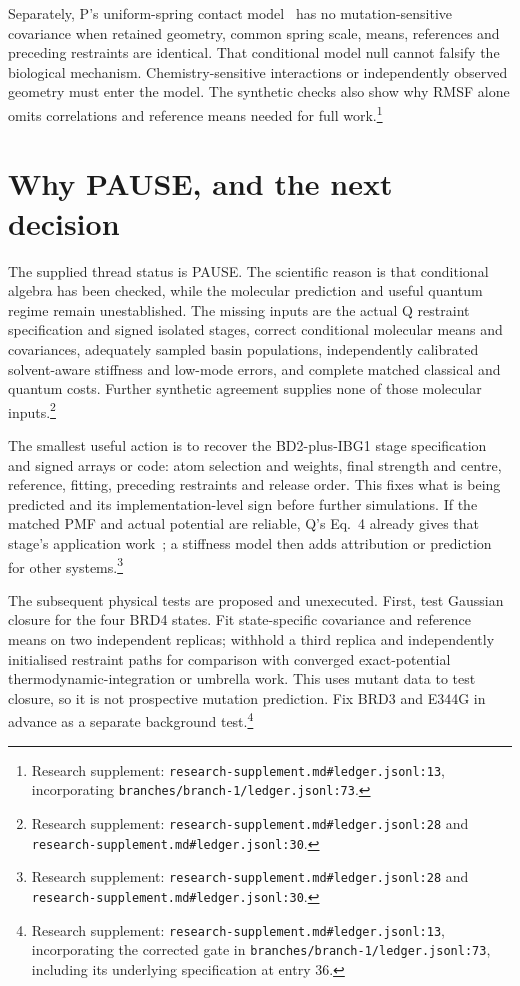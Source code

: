 \documentclass{article}
\begin{document}
Separately, P's uniform-spring contact model~\cite{P} has no mutation-sensitive covariance when retained geometry, common spring scale, means, references and preceding restraints are identical. That conditional model null cannot falsify the biological mechanism. Chemistry-sensitive interactions or independently observed geometry must enter the model. The synthetic checks also show why RMSF alone omits correlations and reference means needed for full work.\footnote{Research supplement: \nolinkurl{research-supplement.md\#ledger.jsonl:13}, incorporating \nolinkurl{branches/branch-1/ledger.jsonl:73}.}

\section{Why PAUSE, and the next decision}

The supplied thread status is PAUSE. The scientific reason is that conditional algebra has been checked, while the molecular prediction and useful quantum regime remain unestablished. The missing inputs are the actual Q restraint specification and signed isolated stages, correct conditional molecular means and covariances, adequately sampled basin populations, independently calibrated solvent-aware stiffness and low-mode errors, and complete matched classical and quantum costs. Further synthetic agreement supplies none of those molecular inputs.\footnote{Research supplement: \nolinkurl{research-supplement.md\#ledger.jsonl:28} and \nolinkurl{research-supplement.md\#ledger.jsonl:30}.}

The smallest useful action is to recover the BD2-plus-IBG1 stage specification and signed arrays or code: atom selection and weights, final strength and centre, reference, fitting, preceding restraints and release order. This fixes what is being predicted and its implementation-level sign before further simulations. If the matched PMF and actual potential are reliable, Q's Eq.~4 already gives that stage's application work~\cite{Q}; a stiffness model then adds attribution or prediction for other systems.\footnote{Research supplement: \nolinkurl{research-supplement.md\#ledger.jsonl:28} and \nolinkurl{research-supplement.md\#ledger.jsonl:30}.}

The subsequent physical tests are proposed and unexecuted. First, test Gaussian closure for the four BRD4 states. Fit state-specific covariance and reference means on two independent replicas; withhold a third replica and independently initialised restraint paths for comparison with converged exact-potential thermodynamic-integration or umbrella work. This uses mutant data to test closure, so it is not prospective mutation prediction. Fix BRD3 and E344G in advance as a separate background test.\footnote{Research supplement: \nolinkurl{research-supplement.md\#ledger.jsonl:13}, incorporating the corrected gate in \nolinkurl{branches/branch-1/ledger.jsonl:73}, including its underlying specification at entry 36.}
\end{document}
